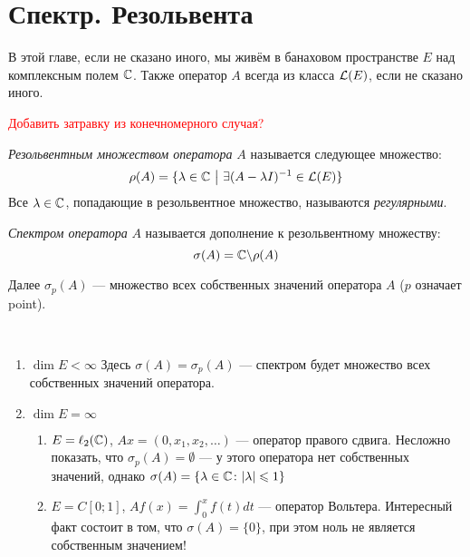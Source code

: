 \section{Спектр. Резольвента}

\begin{note}
	В этой главе, если не сказано иного, мы живём в банаховом пространстве $E$ над комплексным полем $\mathbb{C}$. Также оператор $A$ всегда из класса $\mathcal{L}(E)$, если не сказано иного.
\end{note}

\textcolor{red}{Добавить затравку из конечномерного случая?}

\begin{definition}
	\textit{Резольвентным множеством оператора} $A$ называется следующее множество:
	\[
		\rho(A) = \{\lambda \in \mathbb{C} \ \big|\  \exists (A - \lambda I)^{-1} \in \mathcal{L}(E)\}
	\]
	Все $\lambda \in \mathbb{C}$, попадающие в резольвентное множество, называются \textit{регулярными}.
\end{definition}

\begin{definition}
	\textit{Спектром оператора} $A$ называется дополнение к резольвентному множеству:
	\[
		\sigma(A) = \mathbb{C} \backslash \rho(A)
	\]
\end{definition}

\begin{note}
	Далее $\sigma_p(A)$ --- множество всех собственных значений оператора $A$ ($p$ означает point).
\end{note}

\begin{example}~
	\begin{enumerate}
		\item $\dim E < \infty$ Здесь $\sigma(A) = \sigma_p(A)$ --- спектром будет множество всех собственных значений оператора.
		
		\item $\dim E = \infty$
		\begin{enumerate}
			\item $E = \ell_2(\mathbb{C})$, $Ax = (0, x_1, x_2, \ldots)$ --- оператор правого сдвига. Несложно показать, что $\sigma_p(A) = \emptyset$ --- у этого оператора нет собственных значений, однако   $\sigma(A) = \{\lambda \in \mathbb{C} \colon |\lambda| \leqslant 1\}$
			
			\item $E = C[0; 1]$, $Af(x) = \int_0^x f(t)dt$ --- оператор Вольтера. Интересный факт состоит в том, что $\sigma(A) = \{0\}$, при этом ноль не является собственным значением!
		\end{enumerate}
	\end{enumerate}
\end{example}


